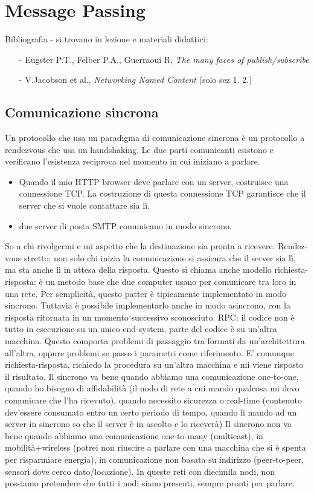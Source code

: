 \documentclass[12pt,italian]{report}
\begin{document}
\chapter{Message Passing}
\label{cap:message passing}
Bibliografia - si trovano in lezione e materiali didattici: 
\begin{itemize}
    \item[-] Eugster P.T., Felber P.A., Guerraoui R, \textit{The many faces of publish/subscribe}
    \item[-] V.Jacobson et al., \textit{Networking Named Content} (solo sez 1. 2.)
\end{itemize}

\section{Comunicazione sincrona}
\label{sec:comsin}
Un protocollo che usa un paradigma di comunicazione sincrona è un protocollo a rendezvous che usa un handshaking. Le due parti comunicanti esistono e verificano l'esistenza reciproca nel momento in cui iniziano a parlare. 
\begin{itemize}
    \item Quando il mio HTTP browser deve parlare con un server, costruisce una connessione TCP. La costruzione di questa connessione TCP garantisce che il server che si vuole contattare sia lì. 
    \item due server di posta SMTP comunicano in modo sincrono.
\end{itemize}

\noindent So a chi rivolgermi e mi aspetto che la destinazione sia pronta a ricevere. 
\bigbreak
\noindent Rendez-vous stretto: non solo chi inizia la comunicazione si assicura che il server sia lì, ma sta anche lì in attesa della risposta. 
\bigbreak
Questo si chiama anche modello richiesta-risposta: è un metodo base che due computer usano per comunicare tra loro in una rete. Per semplicità, questo patter è tipicamente implementato in modo sincrono. Tuttavia è possibile implementarlo anche in modo asincrono, con la risposta ritornata in un momento successivo sconosciuto. 
\bigbreak
\noindent RPC: il codice non è tutto in esecuzione su un unico end-system, parte del codice è su un'altra macchina. Questo comporta problemi di passaggio tra formati da un'architettura all'altra, oppure problemi se passo i parametri come riferimento. E' comunque richiesta-risposta, richiedo la procedura su un'altra macchina e mi viene risposto il risultato. 
\bigbreak
Il sincrono va bene quando abbiamo una comunicazione one-to-one, quando ho bisogno di affidabilità (il nodo di rete a cui mando qualcosa mi devo comunicare che l'ha ricevuto), quando necessito sicurezza o real-time (contenuto dev'essere consumato entro un certo periodo di tempo, quando li mando ad un server in sincrono so che il server è in ascolto e lo riceverà)
\bigbreak Il sincrono non va bene quando abbiamo una comunicazione one-to-many (multicast), in mobilità+wireless (potrei non riuscire a parlare con una macchina che si è spenta per risparmiare energia), in comunicazione non basata su indirizzo (peer-to-peer, sensori dove cerco dato/locazione). In queste reti con diecimila nodi, non possiamo pretendere che tutti i nodi siano presenti, sempre pronti per parlare. 
\bigbreak
\end{document}
